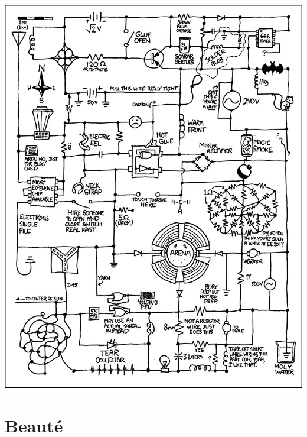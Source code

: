 \documentclass[french]{beamer}
\begin{document}
\begin{frame}

   \begin{center}
     \includegraphics[height=0.9\textheight]{./circuit.jpg}
   \end{center}
 \end{frame}


\section{Beauté}
\end{document}
